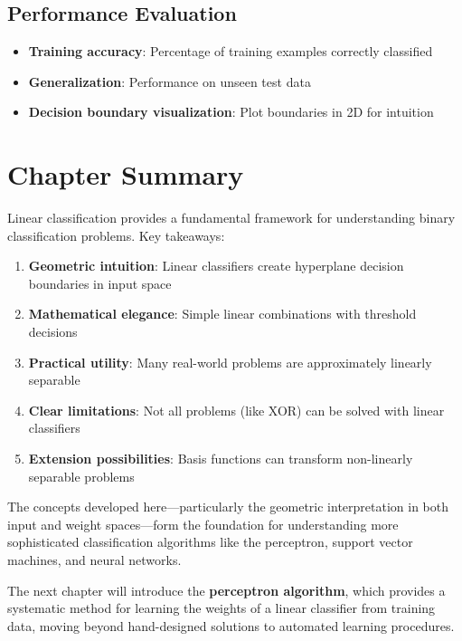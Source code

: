 \subsection{Performance Evaluation}
\begin{itemize}
    \item \textbf{Training accuracy}: Percentage of training examples correctly classified
    \item \textbf{Generalization}: Performance on unseen test data
    \item \textbf{Decision boundary visualization}: Plot boundaries in 2D for intuition
\end{itemize}

\section{Chapter Summary}

Linear classification provides a fundamental framework for understanding binary classification problems. Key takeaways:

\begin{enumerate}
    \item \textbf{Geometric intuition}: Linear classifiers create hyperplane decision boundaries in input space
    \item \textbf{Mathematical elegance}: Simple linear combinations with threshold decisions
    \item \textbf{Practical utility}: Many real-world problems are approximately linearly separable
    \item \textbf{Clear limitations}: Not all problems (like XOR) can be solved with linear classifiers
    \item \textbf{Extension possibilities}: Basis functions can transform non-linearly separable problems
\end{enumerate}

The concepts developed here—particularly the geometric interpretation in both input and weight spaces—form the foundation for understanding more sophisticated classification algorithms like the perceptron, support vector machines, and neural networks.

The next chapter will introduce the \textbf{perceptron algorithm}, which provides a systematic method for learning the weights of a linear classifier from training data, moving beyond hand-designed solutions to automated learning procedures.